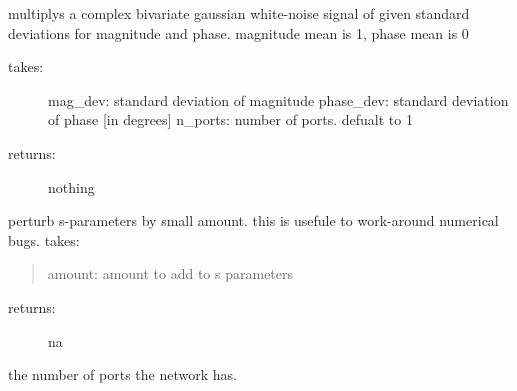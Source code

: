 \documentclass[letterpaper,10pt,english]{sphinxmanual}
\begin{document}
\begin{fulllineitems}
\begin{fulllineitems}
\end{fulllineitems}


\begin{fulllineitems}
\label{api/mwavepy:mwavepy.network.Network.multiply_noise}
multiplys a complex bivariate gaussian white-noise signal
of given standard deviations for magnitude and phase.   
magnitude mean is 1, phase mean is 0
\begin{description}
\item[{takes:}] \leavevmode
mag\_dev: standard deviation of magnitude
phase\_dev: standard deviation of phase {[}in degrees{]}
n\_ports: number of ports. defualt to 1

\item[{returns:}] \leavevmode
nothing

\end{description}

\end{fulllineitems}


\begin{fulllineitems}
\label{api/mwavepy:mwavepy.network.Network.nudge}
perturb s-parameters by small amount. this is usefule to work-around
numerical bugs.
takes:
\begin{quote}

amount: amount to add to s parameters
\end{quote}
\begin{description}
\item[{returns:}] \leavevmode
na

\end{description}

\end{fulllineitems}


\begin{fulllineitems}
\label{api/mwavepy:mwavepy.network.Network.number_of_ports}
the number of ports the network has.

\end{fulllineitems}


\end{fulllineitems}
\end{document}
